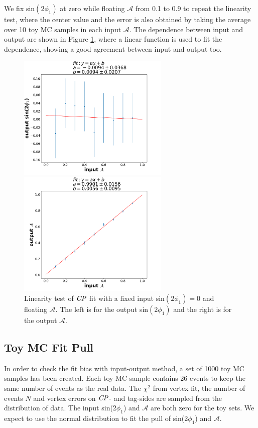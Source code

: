 We fix sin$(2\phi_1)$ at zero while floating $\mathcal{A}$ from  0.1 to 0.9 to repeat the linearity test, where the center value and the error is also obtained by taking the average over 10 toy MC samples in each input $\mathcal{A}$.  The dependence between input and output are shown in Figure \ref{fig:cpfit_line_A}, where a linear function is used to fit the dependence, showing a good agreement between input and output too.
\begin{figure}[htpb]
	\begin{minipage}{0.5\linewidth}
		\includegraphics[height=6cm]{figures/S-test-line_fixS}
	\end{minipage}
	\begin{minipage}{0.5\linewidth}
		\includegraphics[height=6cm]{figures/A-test-line_fixS}
	\end{minipage}
	\caption{Linearity test of $\it{CP}$ fit with a fixed input sin$(2\phi_1)=0$ and floating $\mathcal{A}$. The left is for the output sin$(2\phi_1)$ and the right is for the output $\mathcal{A}$.}
	\label{fig:cpfit_line_A}
\end{figure}

\subsection{Toy MC Fit Pull}
In order to check the fit bias with input-output method, a set of 1000 toy MC samples has been created. Each toy MC sample contains 26 events to keep the same number of events as the real data. The $\chi^2$ from vertex fit, the number of events $N$ and vertex errors on $\it{CP}$- and tag-sides are sampled from the distribution of data. The input sin(2$\phi_1$) and $\mathcal{A}$ are both zero for the toy sets. We expect to use the normal distribution to fit the pull of sin(2$\phi_1$) and $\mathcal{A}$. 

